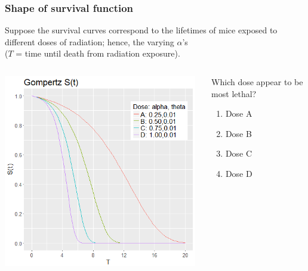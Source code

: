 \begin{frame}
\frametitle{Shape of survival function}
Suppose the survival curves correspond to the lifetimes of mice exposed to different doses of radiation; hence, the varying $\alpha$'s \\($T$ = time until death from radiation exposure). \\
\vskip3pt
\begin{columns}
\includegraphics[width=0.98\textwidth]{Figures/gompertzsurv_varyalpha.png}
\begin{clicker}{Which dose appear to be most lethal?}
\begin{enumerate}
\item Dose A
\item Dose B
\item Dose C
\item Dose D %
\end{enumerate}
\end{clicker}
\end{columns}
\end{frame}

